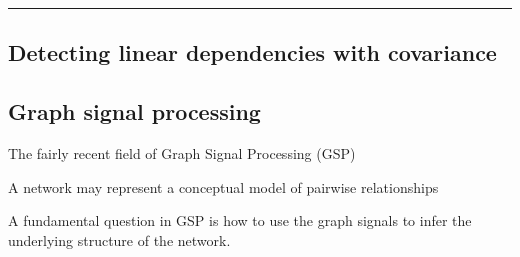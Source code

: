 \hrule



\subsection{Detecting linear dependencies with covariance}
\subsection{Graph signal processing}
The fairly recent field of Graph Signal Processing (GSP) \cite{Mateos2019ConnectingdotsIdentifying}


A network may represent a conceptual model of pairwise relationships

A fundamental question in GSP is how to use the graph signals to infer the underlying structure of the network.

